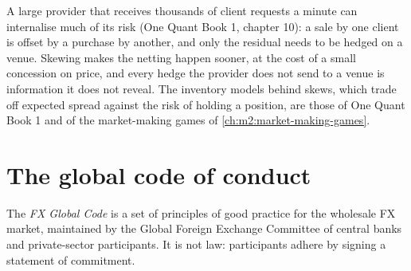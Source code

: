 A large provider that receives thousands of client requests a minute can
internalise much of its risk (One Quant Book 1, chapter 10): a sale by one
client is offset by a purchase by another, and only the residual needs to be
hedged on a venue. Skewing makes the netting happen sooner, at the cost of a
small concession on price, and every hedge the provider does not send to a venue
is information it does not reveal. The inventory models behind skews, which
trade off expected spread against the risk of holding a position, are those of
One Quant Book 1 and of the market-making games of
\cref{ch:m2:market-making-games}.

\begin{omfigure}
\centering
{}

\label{fig:m2:fx-spot-microstructure:skew}
\end{omfigure}

\section{The global code of conduct}

\begin{definition}\label{def:m2:fx-spot-microstructure:code}
The \emph{FX Global Code} is a set of principles of good
practice for the wholesale FX market, maintained by the Global Foreign Exchange
Committee of central banks and private-sector participants. It is not law:
participants adhere by signing a statement of commitment.
\end{definition}

